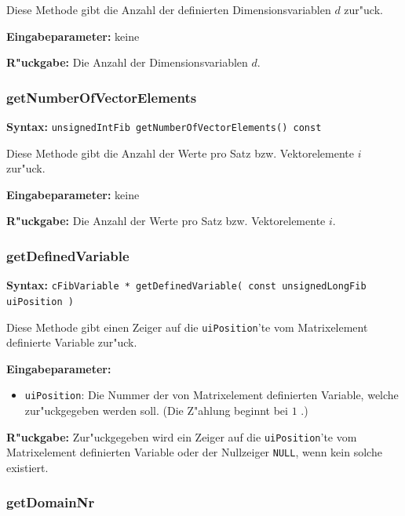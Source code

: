 \bigskip\noindent
Diese Methode gibt die Anzahl der definierten Dimensionsvariablen $d$ zur"uck.

\bigskip\noindent
\textbf{Eingabeparameter:} keine

\bigskip\noindent
\textbf{R"uckgabe:} Die Anzahl der Dimensionsvariablen $d$.


\subsubsection{getNumberOfVectorElements}

\textbf{Syntax:} \verb|unsignedIntFib getNumberOfVectorElements() const|

\bigskip\noindent
Diese Methode gibt die Anzahl der Werte pro Satz bzw. Vektorelemente $i$ zur"uck.

\bigskip\noindent
\textbf{Eingabeparameter:} keine

\bigskip\noindent
\textbf{R"uckgabe:} Die Anzahl der Werte pro Satz bzw. Vektorelemente $i$.


\subsubsection{getDefinedVariable}

\textbf{Syntax:} \verb|cFibVariable * getDefinedVariable( const unsignedLongFib uiPosition )|

\bigskip\noindent
Diese Methode gibt einen Zeiger auf die \verb|uiPosition|'te vom Matrixelement definierte Variable zur"uck.

\bigskip\noindent
\textbf{Eingabeparameter:}
\begin{itemize}
 \item \verb|uiPosition|: Die Nummer der von Matrixelement definierten Variable, welche zur"uckgegeben werden soll. (Die Z"ahlung beginnt bei $1$ .)
\end{itemize}

\bigskip\noindent
\textbf{R"uckgabe:} Zur"uckgegeben wird ein Zeiger auf die \verb|uiPosition|'te vom Matrixelement definierten Variable oder der Nullzeiger \verb|NULL|, wenn kein solche existiert.


\subsubsection{getDomainNr}

